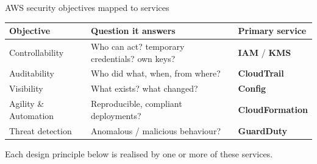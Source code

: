 \documentclass[aspectratio=169,10pt]{beamer}
\newcommand{\svc}[1]{{\color{accent}\textsf{\textbf{#1}}}}      %
\begin{document}
\begin{frame}{AWS security objectives mapped to services}
  \centering\small
  \renewcommand{\arraystretch}{1.35}
  \begin{tabular}{>{\raggedright\arraybackslash}p{2.6cm} >{\raggedright\arraybackslash}p{6.3cm} l}
    \toprule
    \textbf{Objective} & \textbf{Question it answers} & \textbf{Primary service}\\
    \midrule
    Controllability & Who can act? temporary credentials? own keys? & \svc{IAM} / \svc{KMS}\\
    Auditability    & Who did what, when, from where?               & \svc{CloudTrail}\\
    Visibility      & What exists? what changed?                    & \svc{Config}\\
    Agility \& Automation & Reproducible, compliant deployments?    & \svc{CloudFormation}\\
    Threat detection & Anomalous / malicious behaviour?             & \svc{GuardDuty}\\
    \bottomrule
  \end{tabular}
  \vfill
  {\footnotesize\color{midgray}Each design principle below is realised by one or more of these services.}
\end{frame}
\end{document}
